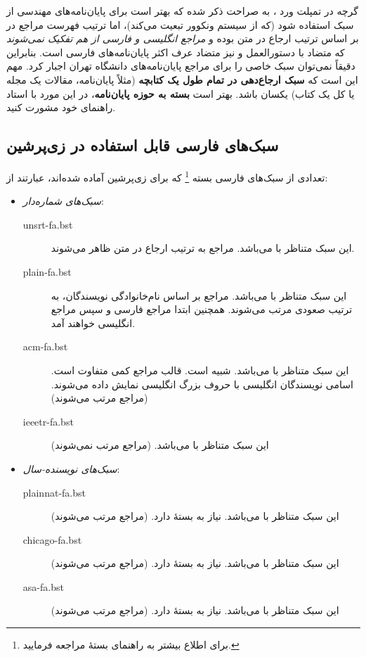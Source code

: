 گرچه در تمپلت ورد
\cite{UTThesisGuide}،
به صراحت ذکر شده که بهتر است برای پایان‌نامه‌های مهندسی از سبک 
استفاده شود (که از سیستم ونکوور تبعیت می‌کند)، اما ترتیب فهرست مراجع در
بر اساس ترتیب ارجاع در متن بوده و
\emph{مراجع انگلیسی و فارسی از هم تفکیک نمی‌شوند}
که متضاد با دستورالعمل
\cite{UTThesisGuide}
و نیز متضاد عرف اکثر پایان‌نامه‌های فارسی است.
بنابراین دقیقاً نمی‌توان سبک خاصی را برای مراجع پایان‌نامه‌های دانشگاه تهران اجبار کرد. مهم این است که
\textbf{سبک ارجاع‌دهی در تمام طول یک کتابچه}
(مثلاً پایان‌نامه، مقالات یک مجله یا کل یک کتاب) یکسان باشد. بهتر است
\textbf{بسته به حوزه پایان‌نامه}،
در این مورد با استاد راهنمای خود مشورت کنید.

\subsection{سبک‌های فارسی قابل استفاده در زی‌پرشین}
تعدادی از سبک‌های فارسی بسته
%
\footnote{ برای اطلاع بیشتر به راهنمای بستهٔ
مراجعه فرمایید.}
که برای  زی‌پرشین آماده شده‌اند، عبارتند از:

\singlespacing
\begin{itemize}
\item \emph{سبک‌های شماره‌دار}:
	\begin{description}
	\item [unsrt-fa.bst] این سبک متناظر با  می‌باشد. مراجع به ترتیب ارجاع در متن ظاهر می‌شوند.
	\item [plain-fa.bst] این سبک متناظر با  می‌باشد. مراجع بر اساس نام‌خانوادگی نویسندگان، به ترتیب صعودی مرتب می‌شوند.
	 همچنین ابتدا مراجع فارسی و سپس مراجع انگلیسی خواهند آمد.
	\item [acm-fa.bst] این سبک متناظر با  می‌باشد. شبیه  است.  قالب مراجع کمی متفاوت است. اسامی نویسندگان انگلیسی با حروف بزرگ انگلیسی نمایش داده می‌شوند. (مراجع مرتب می‌شوند)
	\item [ieeetr-fa.bst] این سبک متناظر با  می‌باشد. (مراجع مرتب نمی‌شوند)
	\end{description}
	
\item \emph{سبک‌های نویسنده-سال}:
	\begin{description}
	\item [plainnat-fa.bst] این سبک متناظر با  می‌باشد. نیاز به بستهٔ  دارد. (مراجع مرتب می‌شوند)
	\item [chicago-fa.bst] این سبک متناظر با  می‌باشد. نیاز به بستهٔ  دارد. (مراجع مرتب می‌شوند)
	\item [asa-fa.bst] این سبک متناظر با  می‌باشد. نیاز به بستهٔ  دارد. (مراجع مرتب می‌شوند)
	\end{description}
\end{itemize}
\doublespacing

